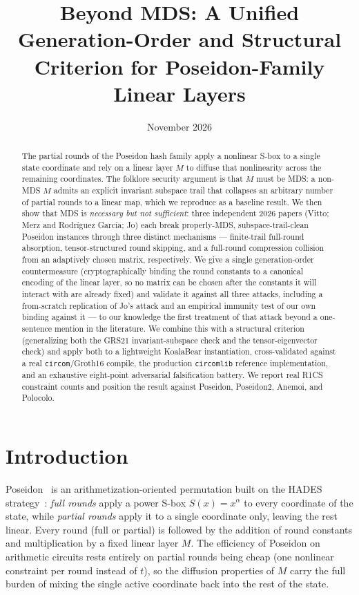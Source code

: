 \documentclass[11pt]{article}
\title{\textbf{Beyond MDS: A Unified Generation-Order and Structural\\
Criterion for Poseidon-Family Linear Layers}}
\author{}
\date{November 2026}
\begin{document}
\maketitle

\begin{abstract}
The partial rounds of the Poseidon hash family apply a nonlinear S-box to a
single state coordinate and rely on a linear layer $M$ to diffuse that
nonlinearity across the remaining coordinates. The folklore security
argument is that $M$ must be MDS: a non-MDS $M$ admits an explicit invariant
subspace trail that collapses an arbitrary number of partial rounds to a
linear map, which we reproduce as a baseline result. We then show that MDS
is \emph{necessary but not sufficient}: three independent 2026 papers
(Vitto; Merz and Rodr\'iguez Garc\'ia; Jo) each break properly-MDS,
subspace-trail-clean Poseidon instances through three distinct mechanisms
--- finite-trail full-round absorption, tensor-structured round skipping,
and a full-round compression collision from an adaptively chosen matrix,
respectively. We give a single generation-order countermeasure
(cryptographically binding the round constants to a canonical encoding of
the linear layer, so no matrix can be chosen after the constants it will
interact with are already fixed) and validate it against all three attacks,
including a from-scratch replication of Jo's attack and an empirical
immunity test of our own binding against it --- to our knowledge the first
treatment of that attack beyond a one-sentence mention in the literature.
We combine this with a structural criterion (generalizing both the
GRS21 invariant-subspace check and the tensor-eigenvector check) and apply
both to a lightweight KoalaBear instantiation, cross-validated against a
real \texttt{circom}/Groth16 compile, the production \texttt{circomlib}
reference implementation, and an exhaustive eight-point adversarial
falsification battery. We report real R1CS constraint counts and position
the result against Poseidon, Poseidon2, Anemoi, and Polocolo.
\end{abstract}

\tableofcontents

\section{Introduction}

Poseidon~\cite{gkr21} is an arithmetization-oriented permutation built on
the HADES strategy~\cite{hades20}: \emph{full rounds} apply a power S-box
$S(x) = x^{\alpha}$ to every coordinate of the state, while \emph{partial
rounds} apply it to a single coordinate only, leaving the rest linear.
Every round (full or partial) is followed by the addition of round
constants and multiplication by a fixed linear layer $M$. The efficiency
of Poseidon on arithmetic circuits rests entirely on partial rounds being
cheap (one nonlinear constraint per round instead of $t$), so the
diffusion properties of $M$ carry the full burden of mixing the single
active coordinate back into the rest of the state.
\end{document}
